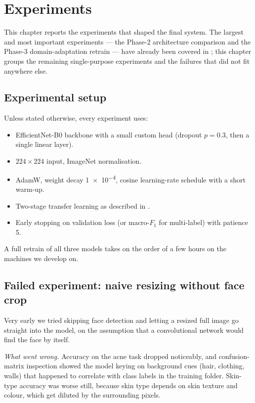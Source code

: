 \documentclass[11pt,a4paper,oneside]{report}
\newcommand{\effnet}{EfficientNet-B0\xspace}
\begin{document}
\chapter{Experiments}\label{ch:experiments}

This chapter reports the experiments that shaped the final system.
The largest and most important experiments --- the Phase-2
architecture comparison and the Phase-3 domain-adaptation retrain
--- have already been covered in ; this chapter
groups the remaining single-purpose experiments and the failures
that did not fit anywhere else.

\section{Experimental setup}

Unless stated otherwise, every experiment uses:

\begin{itemize}
    \item \effnet backbone with a small custom head (dropout
        \(p=0.3\), then a single linear layer).
    \item \(224 \times 224\) input, ImageNet normalisation.
    \item AdamW, weight decay \num{1e-4}, cosine learning-rate
        schedule with a short warm-up.
    \item Two-stage transfer learning as described in
        .
    \item Early stopping on validation loss (or macro-\(F_1\) for
        multi-label) with patience 5.
\end{itemize}

A full retrain of all three models takes on the order of a few
hours on the machines we develop on.

\section{Failed experiment: naive resizing without face crop}

Very early we tried skipping face detection and letting a resized
full image go straight into the model, on the assumption that a
convolutional network would find the face by itself.

\emph{What went wrong.} Accuracy on the acne task dropped
noticeably, and confusion-matrix inspection showed the model
keying on background cues (hair, clothing, walls) that happened to
correlate with class labels in the training folder. Skin-type
accuracy was worse still, because skin type depends on skin
texture and colour, which get diluted by the surrounding pixels.
\end{document}
